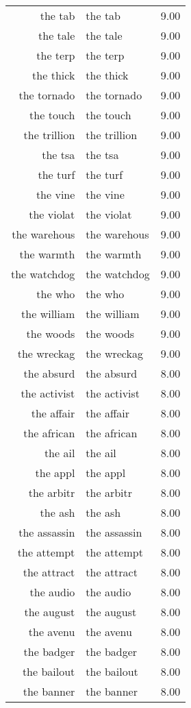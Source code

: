 \begin{table}[ht]
\begin{tabular}{rlr}
  the tab & the tab & 9.00 \\ 
  the tale & the tale & 9.00 \\ 
  the terp & the terp & 9.00 \\ 
  the thick & the thick & 9.00 \\ 
  the tornado & the tornado & 9.00 \\ 
  the touch & the touch & 9.00 \\ 
  the trillion & the trillion & 9.00 \\ 
  the tsa & the tsa & 9.00 \\ 
  the turf & the turf & 9.00 \\ 
  the vine & the vine & 9.00 \\ 
  the violat & the violat & 9.00 \\ 
  the warehous & the warehous & 9.00 \\ 
  the warmth & the warmth & 9.00 \\ 
  the watchdog & the watchdog & 9.00 \\ 
  the who & the who & 9.00 \\ 
  the william & the william & 9.00 \\ 
  the woods & the woods & 9.00 \\ 
  the wreckag & the wreckag & 9.00 \\ 
  the absurd & the absurd & 8.00 \\ 
  the activist & the activist & 8.00 \\ 
  the affair & the affair & 8.00 \\ 
  the african & the african & 8.00 \\ 
  the ail & the ail & 8.00 \\ 
  the appl & the appl & 8.00 \\ 
  the arbitr & the arbitr & 8.00 \\ 
  the ash & the ash & 8.00 \\ 
  the assassin & the assassin & 8.00 \\ 
  the attempt & the attempt & 8.00 \\ 
  the attract & the attract & 8.00 \\ 
  the audio & the audio & 8.00 \\ 
  the august & the august & 8.00 \\ 
  the avenu & the avenu & 8.00 \\ 
  the badger & the badger & 8.00 \\ 
  the bailout & the bailout & 8.00 \\ 
  the banner & the banner & 8.00 \\ 

\end{tabular}
\end{table}
